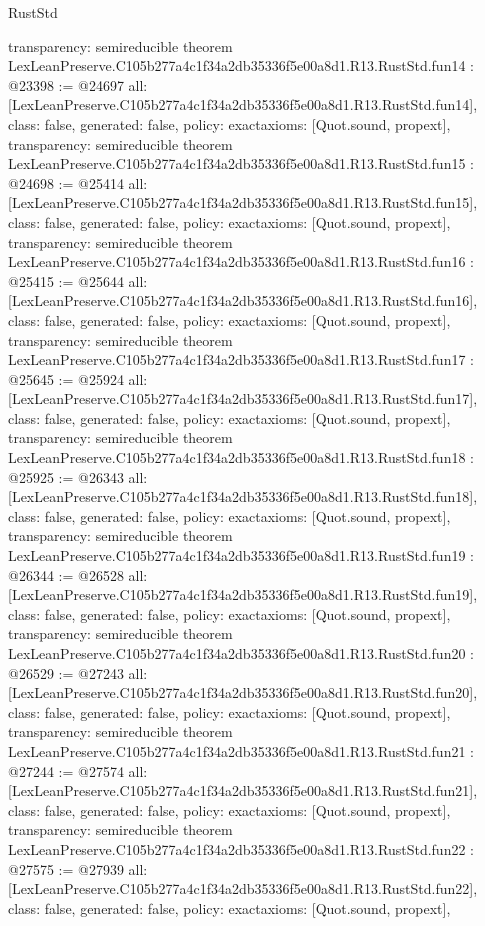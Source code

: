 \begin{lexlean}{RustStd}
\begin{coremodule}
{  transparency: semireducible
}
theorem LexLeanPreserve.C105b277a4c1f34a2db35336f5e00a8d1.R13.RustStd.fun14 : @23398 := @24697 {
  all: [LexLeanPreserve.C105b277a4c1f34a2db35336f5e00a8d1.R13.RustStd.fun14],
  class: false,
  generated: false,
  policy: exact{axioms: [Quot.sound, propext]},
  transparency: semireducible
}
theorem LexLeanPreserve.C105b277a4c1f34a2db35336f5e00a8d1.R13.RustStd.fun15 : @24698 := @25414 {
  all: [LexLeanPreserve.C105b277a4c1f34a2db35336f5e00a8d1.R13.RustStd.fun15],
  class: false,
  generated: false,
  policy: exact{axioms: [Quot.sound, propext]},
  transparency: semireducible
}
theorem LexLeanPreserve.C105b277a4c1f34a2db35336f5e00a8d1.R13.RustStd.fun16 : @25415 := @25644 {
  all: [LexLeanPreserve.C105b277a4c1f34a2db35336f5e00a8d1.R13.RustStd.fun16],
  class: false,
  generated: false,
  policy: exact{axioms: [Quot.sound, propext]},
  transparency: semireducible
}
theorem LexLeanPreserve.C105b277a4c1f34a2db35336f5e00a8d1.R13.RustStd.fun17 : @25645 := @25924 {
  all: [LexLeanPreserve.C105b277a4c1f34a2db35336f5e00a8d1.R13.RustStd.fun17],
  class: false,
  generated: false,
  policy: exact{axioms: [Quot.sound, propext]},
  transparency: semireducible
}
theorem LexLeanPreserve.C105b277a4c1f34a2db35336f5e00a8d1.R13.RustStd.fun18 : @25925 := @26343 {
  all: [LexLeanPreserve.C105b277a4c1f34a2db35336f5e00a8d1.R13.RustStd.fun18],
  class: false,
  generated: false,
  policy: exact{axioms: [Quot.sound, propext]},
  transparency: semireducible
}
theorem LexLeanPreserve.C105b277a4c1f34a2db35336f5e00a8d1.R13.RustStd.fun19 : @26344 := @26528 {
  all: [LexLeanPreserve.C105b277a4c1f34a2db35336f5e00a8d1.R13.RustStd.fun19],
  class: false,
  generated: false,
  policy: exact{axioms: [Quot.sound, propext]},
  transparency: semireducible
}
theorem LexLeanPreserve.C105b277a4c1f34a2db35336f5e00a8d1.R13.RustStd.fun20 : @26529 := @27243 {
  all: [LexLeanPreserve.C105b277a4c1f34a2db35336f5e00a8d1.R13.RustStd.fun20],
  class: false,
  generated: false,
  policy: exact{axioms: [Quot.sound, propext]},
  transparency: semireducible
}
theorem LexLeanPreserve.C105b277a4c1f34a2db35336f5e00a8d1.R13.RustStd.fun21 : @27244 := @27574 {
  all: [LexLeanPreserve.C105b277a4c1f34a2db35336f5e00a8d1.R13.RustStd.fun21],
  class: false,
  generated: false,
  policy: exact{axioms: [Quot.sound, propext]},
  transparency: semireducible
}
theorem LexLeanPreserve.C105b277a4c1f34a2db35336f5e00a8d1.R13.RustStd.fun22 : @27575 := @27939 {
  all: [LexLeanPreserve.C105b277a4c1f34a2db35336f5e00a8d1.R13.RustStd.fun22],
  class: false,
  generated: false,
  policy: exact{axioms: [Quot.sound, propext]},
}
\end{coremodule}
\end{lexlean}
